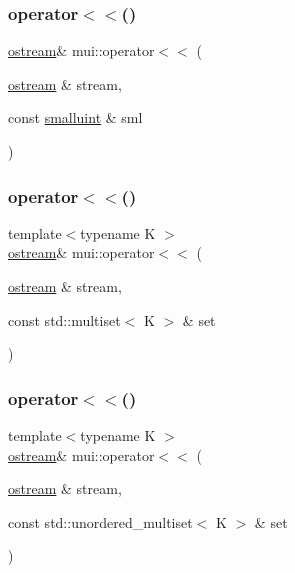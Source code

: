 \mbox{\label{namespacemui_a595e36ff46eee96b5d0b950cfe7075dd}} 
\subsubsection{\texorpdfstring{operator$<$$<$()}{operator<<()}\hspace{0.1cm}{\footnotesize\ttfamily [14/21]}}
{\footnotesize\ttfamily \hyperlink{classmui_1_1ostream}{ostream}\& mui\+::operator$<$$<$ (\begin{DoxyParamCaption}\item[{\hyperlink{classmui_1_1ostream}{ostream} \&}]{stream,  }\item[{const \hyperlink{structmui_1_1smalluint}{smalluint} \&}]{sml }\end{DoxyParamCaption})\hspace{0.3cm}{\ttfamily [inline]}}

\mbox{\label{namespacemui_ae3f4463532b4a78282cf04736196bdc4}} 
\subsubsection{\texorpdfstring{operator$<$$<$()}{operator<<()}\hspace{0.1cm}{\footnotesize\ttfamily [15/21]}}
{\footnotesize\ttfamily template$<$typename K $>$ \\
\hyperlink{classmui_1_1ostream}{ostream}\& mui\+::operator$<$$<$ (\begin{DoxyParamCaption}\item[{\hyperlink{classmui_1_1ostream}{ostream} \&}]{stream,  }\item[{const std\+::multiset$<$ K $>$ \&}]{set }\end{DoxyParamCaption})\hspace{0.3cm}{\ttfamily [inline]}}

\mbox{\label{namespacemui_a2b43d4ae1d37d8f12b77cae58128eea5}} 
\subsubsection{\texorpdfstring{operator$<$$<$()}{operator<<()}\hspace{0.1cm}{\footnotesize\ttfamily [16/21]}}
{\footnotesize\ttfamily template$<$typename K $>$ \\
\hyperlink{classmui_1_1ostream}{ostream}\& mui\+::operator$<$$<$ (\begin{DoxyParamCaption}\item[{\hyperlink{classmui_1_1ostream}{ostream} \&}]{stream,  }\item[{const std\+::unordered\+\_\+multiset$<$ K $>$ \&}]{set }\end{DoxyParamCaption})\hspace{0.3cm}{\ttfamily [inline]}}

